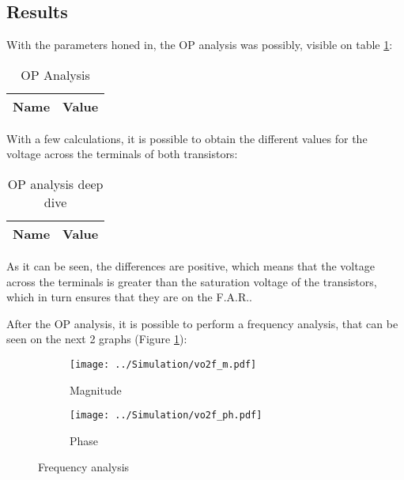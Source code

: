  


\subsection{Results}

\indent

With the parameters honed in, the OP analysis was possibly, visible on table \ref{tab:OP_ngs}:

\begin{table}[H]
  \centering
  \begin{tabular}{|l|r|}
    \hline    
    {\bf Name} & {\bf Value} \\ \hline
    
  \end{tabular}
  \caption{OP Analysis}
  \label{tab:OP_ngs}
\end{table}

With a few calculations, it is possible to obtain the different values for the voltage across the terminals of both transistors:

\begin{table}[H]
  \centering
  \begin{tabular}{|l|r|}
    \hline    
    {\bf Name} & {\bf Value} \\ \hline
    
  \end{tabular}
  \caption{OP analysis deep dive}
  \label{tab:OP2_ngs}
\end{table}

As it can be seen, the differences are positive, which means that the voltage across the terminals is greater than the saturation voltage of the transistors, which in turn ensures that they are on the F.A.R..

After the OP analysis, it is possible to perform a frequency analysis, that can be seen on the next 2 graphs (Figure \ref{fig:FreqANGS}):

\begin{figure}[H]
\centering
\begin{subfigure}{.5\textwidth}
  \centering
  \texttt{[image: ../Simulation/vo2f\_m.pdf]}
  \caption{Magnitude}
\end{subfigure}%
\begin{subfigure}{.5\textwidth}
  \centering
  \texttt{[image: ../Simulation/vo2f\_ph.pdf]}
  \caption{Phase}
\end{subfigure}
\caption{Frequency analysis}
\label{fig:FreqANGS}
\end{figure}


